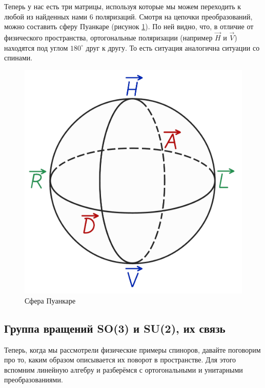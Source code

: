 Теперь у нас есть три матрицы, используя которые мы можем переходить к любой из найденных нами 6 поляризаций. Смотря на цепочки преобразований, можно составить сферу Пуанкаре (рисунок \ref{fig B.6}). По ней видно, что, в отличие от физического пространства, ортогональные поляризации (например $\Vec{H}$ и $\Vec{V}$) находятся под углом $180^{\circ}$ друг к другу. То есть ситуация аналогична ситуации со спинами.
\begin{figure}[!ht]
\centering
\includegraphics[scale=0.23]{appendix/images/Poincare sphere.png}
\caption{Сфера Пуанкаре}
\label{fig B.6}
\end{figure}

\subsection{Группа вращений SO(3) и SU(2), их связь}
Теперь, когда мы рассмотрели физические примеры спиноров, давайте поговорим про то, каким образом описывается их поворот в пространстве. Для этого вспомним линейную алгебру и разберёмся с ортогональными и унитарными преобразованиями.

